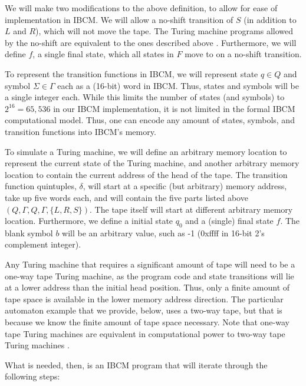 We will make two modifications to the above definition, to allow for
ease of implementation in IBCM.  We will allow a no-shift transition
of $S$ (in addition to $L$ and $R$), which will not move the tape.
The Turing machine programs allowed by the no-shift are equivalent to
the ones described above \cite{wikipedia:turingmachine}. Furthermore,
we will define $f$, a single final state, which all states in $F$ move
to on a no-shift transition.

To represent the transition functions in IBCM, we will represent state
$q \in Q$ and symbol $\Sigma \in \Gamma$ each as a (16-bit) word in
IBCM.  Thus, states and symbols will be a single integer each.  While
this limits the number of states (and symbols) to $2^{16}=65,536$ in
our IBCM implementation, it is not limited in the formal IBCM
computational model.  Thus, one can encode any amount of states,
symbols, and transition functions into IBCM's memory.

To simulate a Turing machine, we will define an arbitrary memory
location to represent the current state of the Turing machine, and
another arbitrary memory location to contain the current address of
the head of the tape.  The transition function quintuples, $\delta$,
will start at a specific (but arbitrary) memory address, take up five
words each, and will contain the five parts listed above
$(Q,\Gamma,Q,\Gamma,\{L,R,S\})$.  The tape itself will start at
different arbitrary memory location.  Furthermore, we define a initial
state $q_0$ and a (single) final state $f$.  The blank symbol $b$ will
be an arbitrary value, such as -1 (0xffff in 16-bit 2's complement
integer).

Any Turing machine that requires a significant amount of tape will
need to be a one-way tape Turing machine, as the program code and
state transitions will lie at a lower address than the initial head
position.  Thus, only a finite amount of tape space is available in
the lower memory address direction.  The particular automaton example
that we provide, below, uses a two-way tape, but that is because we
know the finite amount of tape space necessary.  Note that one-way
tape Turing machines are equivalent in computational power to two-way
tape Turing machines \cite{HopcroftAndUllman}.

What is needed, then, is an IBCM program that will iterate through the
following steps:

